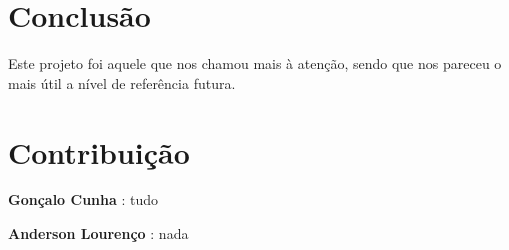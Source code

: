 \chapter{Conclusão}

Este projeto foi aquele que nos chamou mais à atenção, sendo que nos pareceu o mais útil a nível de referência futura.

\chapter{Contribuição}

\textbf{\Large Gonçalo Cunha} : tudo

\textbf{\Large Anderson Lourenço} : nada


